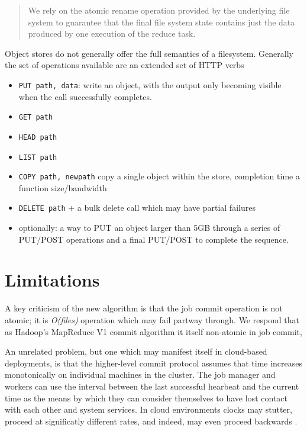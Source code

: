 \documentclass[9pt,technote]{IEEEtran}
\begin{document}
\begin{quote}
We rely on the atomic rename operation provided by the underlying file system to guarantee that the final file system state contains just the data produced by one execution of the reduce task.
\end{quote}
\cite{Dean:2004:MSD:1251254.1251264}

Object stores do not generally offer the full semantics of a filesystem. Generally the set of operations available are an extended set of HTTP verbs

\begin{itemize}
  \item{\texttt{PUT path, data}: write an object, with the output only becoming visible when the call successfully completes.}
  \item{\texttt{GET path}}
  \item{\texttt{HEAD path}}
  \item{\texttt{LIST path}}
  \item{\texttt{COPY path, newpath} copy a single object within the store, completion time a function size/bandwidth}
  \item{\texttt{DELETE path}  + a bulk delete call which may have partial failures}
  \item{optionally: a way to PUT an object larger than 5GB through a series of PUT/POST operations and a final PUT/POST to complete the sequence.}
\end{itemize}

\section{Limitations}

A key criticism of the new algorithm is that the job commit operation is not atomic; it is \emph{O(files)} operation which may fail partway through. We respond that as Hadoop's MapReduce V1 commit algorithm it itself non-atomic in job commit, 

An unrelated problem, but one which may manifest itself in cloud-based deployments, is that the higher-level commit protocol assumes that time increases monotonically on individual machines in the cluster. The job manager and workers can use the interval between the last successful hearbeat and the current time as the means by which they can consider themselves to have lost contact with each other and system services. In cloud environments clocks may stutter, proceed at significatly different rates, and indeed, may even proceed backwards \cite{anything?}. 
\end{document}
